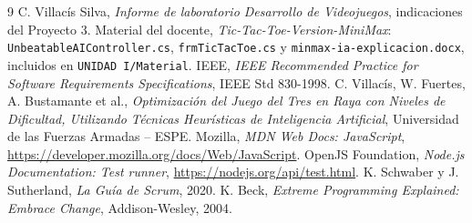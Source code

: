 \documentclass[12pt,a4paper]{article}
\begin{document}
\begin{thebibliography}{9}
 C. Villacís Silva, \emph{Informe de laboratorio Desarrollo de Videojuegos}, indicaciones del Proyecto 3.
 Material del docente, \emph{Tic-Tac-Toe-Version-MiniMax}: \texttt{UnbeatableAIController.cs}, \texttt{frmTicTacToe.cs} y \texttt{minmax-ia-explicacion.docx}, incluidos en \texttt{UNIDAD I/Material}.
 IEEE, \emph{IEEE Recommended Practice for Software Requirements Specifications}, IEEE Std 830-1998.
 C. Villacís, W. Fuertes, A. Bustamante et al., \emph{Optimización del Juego del Tres en Raya con Niveles de Dificultad, Utilizando Técnicas Heurísticas de Inteligencia Artificial}, Universidad de las Fuerzas Armadas -- ESPE.
 Mozilla, \emph{MDN Web Docs: JavaScript}, \url{https://developer.mozilla.org/docs/Web/JavaScript}.
 OpenJS Foundation, \emph{Node.js Documentation: Test runner}, \url{https://nodejs.org/api/test.html}.
 K. Schwaber y J. Sutherland, \emph{La Guía de Scrum}, 2020.
 K. Beck, \emph{Extreme Programming Explained: Embrace Change}, Addison-Wesley, 2004.
\end{thebibliography}
\end{document}

